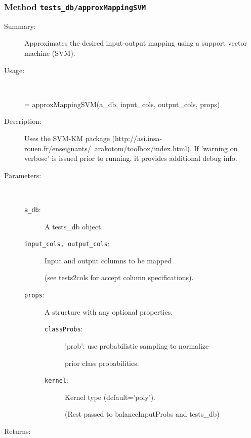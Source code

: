 \subsubsection[Method \texttt{approxMappingSVM}]{Method \texttt{tests\_db/approxMappingSVM}}%
%
\label{ref_tests_db__approxMappingSVM}%
\hypertarget{ref_tests_db__approxMappingSVM}{}%
\begin{description}
\item[Summary:]Approximates the desired input-output mapping using a support vector machine (SVM).
%
\item[Usage:]~%
\begin{lyxcode}%
[an\_approx\_db, an\_svm] = approxMappingSVM(a\_db, input\_cols, output\_cols, props)
%
\end{lyxcode}%
%
\item[Description:]%
Uses the SVM-KM package
 (http://asi.insa-rouen.fr/enseignants/~arakotom/toolbox/index.html). If
 'warning on verbose' is issued prior to running, it provides additional
 debug info.
\item[Parameters:]~
\begin{description}%
\item[\texttt{a\_db}:]
 A tests\_db object.
\item[\texttt{input\_cols, output\_cols}:]
 Input and output columns to be mapped

(see tests2cols for accept column specifications).
\item[\texttt{props}:]
 A structure with any optional properties.
\begin{description}%
\item[\texttt{classProbs}:]
 'prob': use probabilistic sampling to normalize

prior class probabilities.
\item[\texttt{kernel}:]
 Kernel type (default='poly').

(Rest passed to balanceInputProbs and tests\_db)
\end{description}%
\end{description}%
%
\item[Returns:
]~


\end{description}
